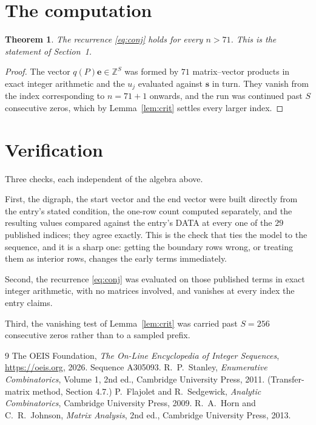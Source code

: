 \documentclass[11pt,a4paper]{article}
\theoremstyle{plain}
\newtheorem{theorem}{Theorem}
\theoremstyle{definition}
\begin{document}
\section{The computation}

\begin{theorem}
The recurrence \eqref{eq:conj} holds for every $n>71$. This is the statement of
Section~1.
\end{theorem}

\begin{proof}
The vector $q(P)\mathbf{e}\in\mathbb{Z}^{S}$ was formed by $71$ matrix--vector
products in exact integer arithmetic and the $u_j$ evaluated against $\mathbf{s}$ in turn.
They vanish from the index corresponding to $n=71+1$ onwards, and the run was continued
past $S$ consecutive zeros, which by Lemma~\ref{lem:crit} settles every larger index.
\end{proof}

\section{Verification}

Three checks, each independent of the algebra above.

First, the digraph, the start vector and the end vector were built directly from the
entry's stated condition, the one-row count computed separately, and the resulting values
compared against the entry's DATA at every one of the $29$ published indices; they
agree exactly. This is the check that ties the model to the sequence, and it is a sharp one:
getting the boundary rows wrong, or treating them as interior rows, changes the early terms
immediately.

Second, the recurrence \eqref{eq:conj} was evaluated on those published terms in exact
integer arithmetic, with no matrices involved, and vanishes at every index the entry claims.

Third, the vanishing test of Lemma~\ref{lem:crit} was carried past $S=256$ consecutive
zeros rather than to a sampled prefix.

\begin{thebibliography}{9}
 The OEIS Foundation, \emph{The On-Line Encyclopedia of Integer
Sequences}, \url{https://oeis.org}, 2026. Sequence A305093.
 R.~P.~Stanley, \emph{Enumerative Combinatorics}, Volume 1, 2nd ed.,
Cambridge University Press, 2011. (Transfer-matrix method, Section 4.7.)
 P.~Flajolet and R.~Sedgewick, \emph{Analytic Combinatorics}, Cambridge
University Press, 2009.
 R.~A.~Horn and C.~R.~Johnson, \emph{Matrix Analysis}, 2nd ed., Cambridge
University Press, 2013.
\end{thebibliography}
\end{document}
